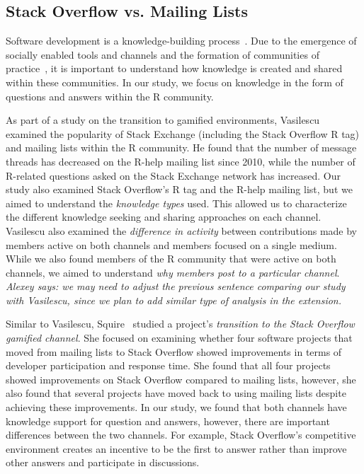 \documentclass[smallextended]{svjour3}       %
\newcommand{\alexey}[1]{{\color{cyan}\emph{Alexey says: #1}}\xspace}
\newcommand{\alexey}[1]{}
\newcommand{\SO}{Stack Overflow\xspace}
\newcommand{\RH}{R-help\xspace}
\begin{document}
\subsection{\SO vs. Mailing Lists}
Software development is a knowledge-building process~\cite{naur1985programming}. Due to the emergence of socially enabled tools and channels and the formation of communities of practice~\cite{Storey2014}, it is important to understand how knowledge is created and shared within these communities. In our study, we focus on knowledge in the form of questions and answers within the R community.


As part of a study on the transition to gamified environments, Vasilescu~\cite{Vasi1escu2014PhD} examined the popularity of Stack Exchange (including the \SO R tag) and
mailing lists within the R community. He found that the number of message threads has decreased on the \RH mailing list since 2010, while the number of
R-related questions asked on the Stack Exchange network has increased. Our study also examined \SO's R tag and the \RH mailing list, but we aimed to understand the \textit{knowledge types} used. This allowed us to characterize the different knowledge seeking and sharing approaches on each channel. Vasilescu also examined the \textit{difference in activity} between contributions made by members active on both channels and members focused on a single medium. While we also found members of the R community that were active on both channels, we aimed to understand \textit{why members post to a particular channel}.
\alexey{we may need to adjust the previous sentence comparing our study with Vasilescu, since we plan to add similar type of analysis in the extension.}

Similar to Vasilescu, Squire~\cite{Squire2015a} studied a project's \textit{transition to the \SO gamified channel}. She focused on examining whether four software projects that moved from mailing lists to \SO showed improvements in terms of developer participation and response time. She found that all four projects showed improvements on \SO compared to mailing lists, however, she also found that several projects have moved back to using mailing lists despite achieving these improvements. In our study, we found that both channels have knowledge support for question and answers, however, there are important differences between the two channels. For example, \SO's competitive environment creates an incentive to be the first to answer rather than improve other answers and participate in discussions.
\end{document}
